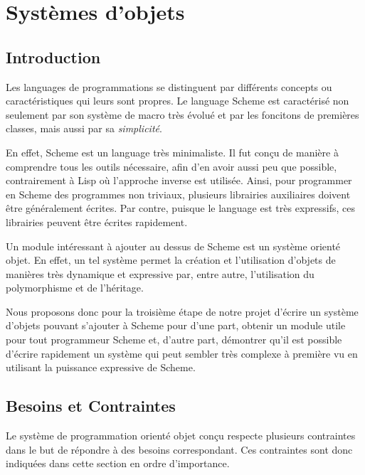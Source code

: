 

\chapter{Systèmes d'objets}

\section{Introduction}

Les languages de programmations se distinguent par différents concepts
ou caractéristiques qui leurs sont propres. Le language Scheme est
caractérisé non seulement par son système de macro très évolué et par
les foncitons de premières classes, mais aussi par sa
\emph{simplicité}.

En effet, Scheme est un language très minimaliste. Il fut conçu de
manière à comprendre tous les outils nécessaire, afin d'en avoir aussi
peu que possible, contrairement à Lisp où l'approche inverse est
utilisée. Ainsi, pour programmer en Scheme des programmes non
triviaux, plusieurs librairies auxiliaires doivent être généralement
écrites. Par contre, puisque le language est très expressifs, ces
librairies peuvent être écrites rapidement.

Un module intéressant à ajouter au dessus de Scheme est un système
orienté objet. En effet, un tel système permet la création et
l'utilisation d'objets de manières très dynamique et expressive par,
entre autre, l'utilisation du polymorphisme et de l'héritage.

Nous proposons donc pour la troisième étape de notre projet d'écrire
un système d'objets pouvant s'ajouter à Scheme pour d'une part,
obtenir un module utile pour tout programmeur Scheme et, d'autre part,
démontrer qu'il est possible d'écrire rapidement un système qui peut
sembler très complexe à première vu en utilisant la puissance
expressive de Scheme.




  \section{Besoins et Contraintes}
    Le système de programmation orienté objet conçu respecte plusieurs
    contraintes dans le but de répondre à des besoins
    correspondant. Ces contraintes sont donc indiquées dans cette
    section en ordre d'importance.

